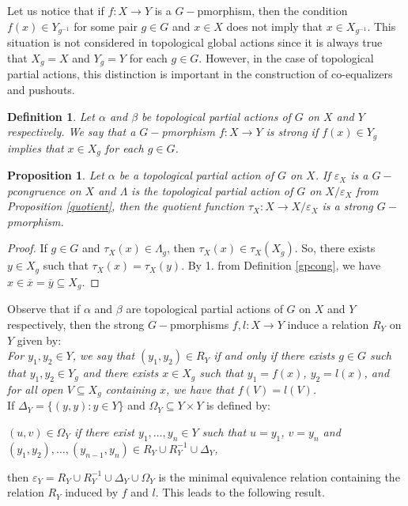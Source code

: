 \documentclass[sn-mathphys-num]{sn-jnl}%
\theoremstyle{thmstyleone}%
\newtheorem{proposition}[theorem]{Proposition}%
\theoremstyle{thmstyletwo}%
\theoremstyle{thmstylethree}%
\newtheorem{definition}{Definition}%
\begin{document}
Let us notice that if $ f: X \to Y $ is a $G-$pmorphism, then the condition $ f (x) \in Y_{g^{- 1}} $ for some pair $ g \in G $ and $ x \in X $ does not imply that $ x \in X_{g^{-1}} $. This situation is not considered in topological global actions since it is always true that $ X_g = X $ and $ Y_g = Y $ for each $ g \in G $. However, in the case of topological partial actions, this distinction is important in the construction of co-equalizers and pushouts.\\

\begin{definition}
Let $ \alpha $ and $ \beta $ be topological partial actions of $ G $ on $ X $ and $ Y $ respectively. We say that a $G-$pmorphism $ f: X \to Y $ is strong if $ f (x) \in Y_g $ implies that $ x \in X_g $ for each $ g \in G $.\\
\end{definition}

\begin{proposition}
Let $ \alpha $ be a topological partial action of $ G $ on $ X $. If $ \varepsilon_X $ is a $G-$pcongruence on $ X $ and $\Lambda$ is the topological partial action of $ G $ on $ X/\varepsilon_X $ from Proposition \ref{quotient}, then the quotient function $ \tau_X: X \to X / \varepsilon_X $ is a strong $G-$pmorphism.
\end{proposition}

\begin{proof}
If $g\in G$ and $\tau_X(x)\in \Lambda_g$, then $\tau_X(x)\in \tau_X(X_g)$. So, there exists $y\in X_g$ such that $\tau_X(x) = \tau_X(y)$. By 1. from Definition \ref{gpcong}, we have $x \in \overline{x} = \overline{y} \subseteq X_g$.
\end{proof}

Observe that if $ \alpha $ and $ \beta $ are topological partial actions of $ G $ on $ X $ and $ Y $ respectively, then the strong $G-$pmorphisms $ f, l: X \to Y $ induce a relation $ R_Y $ on $ Y $ given by:\\

\emph{For $y_1, y_2 \in Y$, we say that $(y_1, y_2) \in R_Y$ if and only if there exists $g \in G$ such that $y_1, y_2 \in Y_g$ and there exists $ x \in X_{g} $ such that $y_1 = f(x)$, $y_2 = l(x)$, and for all open $V \subseteq X_g$ containing $x$, we have that $f(V) = l(V)$.}\\

If $\Delta_Y = \{(y,y) : y \in Y\}$ and $\Omega_Y \subseteq Y \times Y$ is defined by:
\begin{center}
\emph{$(u, v) \in \Omega_Y$ if there exist $y_1, \dots, y_n \in Y$ such that $u = y_1$, $v = y_n$ and $(y_1, y_2), \dots, (y_{n-1}, y_n) \in R_Y \cup R_Y^{-1} \cup \Delta_Y$,}
\end{center}
then $\varepsilon_Y = R_Y \cup R_Y^{-1} \cup \Delta_Y \cup \Omega_Y$
is the minimal equivalence relation containing the relation $ R_Y $ induced by $f$ and $l$. This leads to the following result.\\
\end{document}
